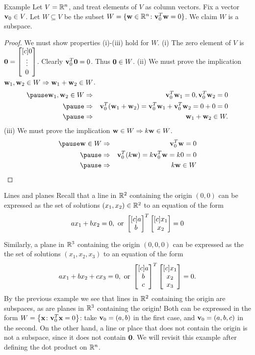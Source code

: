 \begin{frame}{Example}
\footnotesize
Let $V={\mathbb R}^n$, and treat elements of $V$ as \alert{column vectors}. Fix a vector ${\mathbf v}_0\in V$. Let $W\subseteq V$ be the subset $W=\{{\mathbf w}\in {\mathbb R}^n\colon {\mathbf v}_0^T{\mathbf w}=0\}$. We claim $W$ is a subspace. 
\pause \begin{proof}
We must show properties (i)-(iii) hold for $W$. 
\bpause
(i) The zero element of $V$ is ${\mathbf 0}=\begin{bmatrix}[c] 0\\ \vdots\\ 0 \end{bmatrix}$. Clearly ${\mathbf v}_0^T{\mathbf 0}=0$. Thus ${\mathbf 0}\in W$. 
\bpause
(ii) We must prove the implication ${\mathbf w}_1, {\mathbf w}_2\in W\Rightarrow {\mathbf w}_1+{\mathbf w}_2\in W$. 
\begin{eqnarray*}
\pause\boldw_1,\boldw_2\in W&\Rightarrow& \boldv_0^T\boldw_1=0,\boldv_0^T\boldw_2=0 \\
\pause&\Rightarrow&\boldv_0^T(\boldw_1+\boldw_2)=\boldv_0^T\boldw_1+\boldv_0^T\boldw_2=0+0=0\\
\pause&\Rightarrow& \boldw_1+\boldw_2\in W.
\end{eqnarray*}
\pause
(iii) We must prove the implication ${\mathbf w}\in W\Rightarrow k{\mathbf w}\in W$. 
\begin{eqnarray*}
\pause\boldw\in W&\Rightarrow& \boldv_0^T\boldw=0\\
\pause&\Rightarrow& \boldv_0^T(k\boldw)=k\boldv_0^T\boldw=k0=0\\
\pause&\Rightarrow& k\boldw\in W
\end{eqnarray*}
\end{proof}
\end{frame}
\begin{frame}{Lines and planes}
Recall that a line in ${\mathbb R}^2$ \alert{containing the origin $(0,0)$} can be expressed as the set of solutions $(x_1,x_2)\in{\mathbb R}^2$ to an equation of the form
\[
ax_1+bx_2=0, \text{ or } \begin{bmatrix}[c] a\\b \end{bmatrix}^T\begin{bmatrix}[c] x_1\\ x_2 \end{bmatrix}=0
\]

Similarly, a plane in ${\mathbb R}^3$ \alert{containing the origin $(0,0,0)$} can be expressed as the the set of solutions $(x_1,x_2,x_3)$ to an equation of the form 
\[
ax_1+bx_2+cx_3=0, \text{ or } \begin{bmatrix}[c] a\\b\\c \end{bmatrix}^T\begin{bmatrix}[c] x_1\\x_2\\x_3 \end{bmatrix}=0.
\]
\pause By the previous example we see that lines in ${\mathbb R}^2$ containing the origin are subspaces, as are planes in ${\mathbb R}^3$ containing the origin! Both can be expressed in the form $W=\left\{{\mathbf x}\colon {\mathbf v}_0^T{\mathbf x}=0\right\}$: take ${\mathbf v}_0=(a,b)$ in the first case, and ${\mathbf v}_0=(a,b,c)$ in the second. 
\bpause
On the other hand, a line or place that does \alert{not} contain the origin is not a subspace, since it does not contain ${\mathbf 0}$. 
\bpause
We will revisit this example after defining the dot product on ${\mathbb R}^n$. 
\end{frame}
